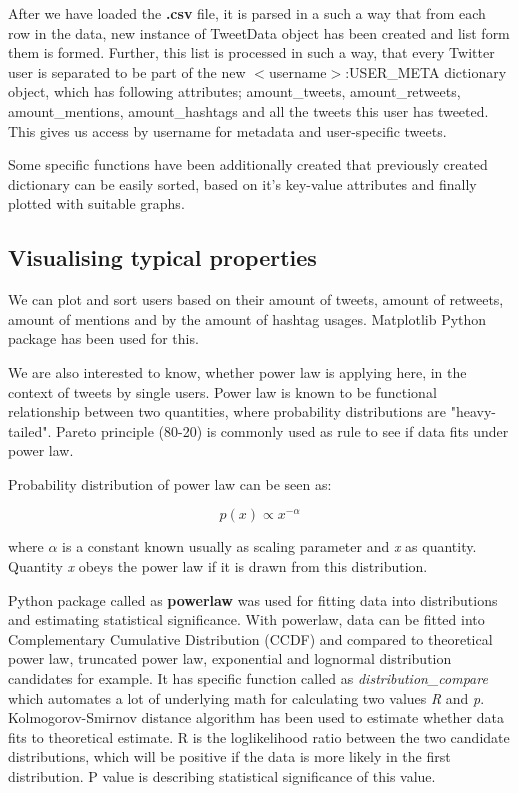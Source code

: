 After we have loaded the \textbf{.csv} file, it is parsed in a such a way that from each row in the data, new instance
of TweetData object has been created and list form them is formed.
Further, this list is processed in such a way, that every Twitter user is separated to be part of the new
$<$username$>$:USER\_META dictionary object, which has following attributes; amount\_tweets, amount\_retweets, amount\_mentions, amount\_hashtags and all the tweets this user has tweeted.
This gives us access by username for metadata and user-specific tweets.

Some specific functions have been additionally created that previously created dictionary can be easily sorted, based on it's key-value attributes and finally plotted with suitable graphs.

\subsection{Visualising typical properties}

We can plot and sort users based on their amount of tweets, amount of retweets, amount of mentions and by the amount of hashtag usages.
Matplotlib Python package has been used for this.

We are also interested to know, whether power law is applying here, in the context of tweets by single users.
Power law is known to be functional relationship between two quantities, where probability distributions are  "heavy-tailed".
Pareto principle (80-20) is commonly used as rule to see if data fits under power law\cite{enwiki:1023956740}.

Probability distribution of power law can be seen as:

\begin{equation}
    p(x) \propto x^{-\alpha}\label{eq:equation1}
\end{equation}

where $\alpha$ is a constant known usually as scaling parameter and \textit{x} as quantity.
Quantity \textit{x} obeys the power law if it is drawn from this distribution.\cite{doi:10.1137/070710111}

Python package called as \textbf{powerlaw}\cite{Alstott_2014} was used for fitting data into distributions and estimating statistical significance.
With powerlaw, data can be fitted into Complementary Cumulative Distribution (CCDF) and compared to theoretical power law, truncated power law, exponential and lognormal distribution candidates for example.
It has specific function called as \textit{distribution\_compare} which automates a lot of underlying math for calculating two values \textit{R} and \textit{p}.
Kolmogorov-Smirnov distance algorithm has been used to estimate whether data fits to theoretical estimate.
R is the loglikelihood ratio between the two candidate distributions, which will be positive if the data is more likely in the first distribution.
P value is describing statistical significance of this value.

